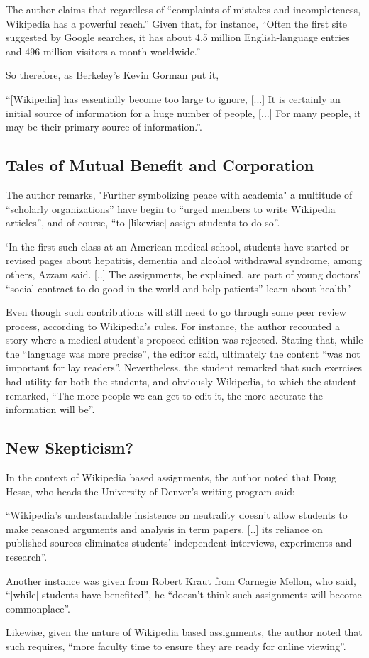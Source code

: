 The author claims that regardless of ``complaints of mistakes and incompleteness, Wikipedia has a powerful reach.'' Given that, for instance, ``Often the first site suggested by Google searches, it has about 4.5 million English-language entries and 496 million visitors a month worldwide.''

So therefore, as Berkeley’s Kevin Gorman put it,

``[Wikipedia] has essentially become too large to ignore, [...] It is certainly an initial source of information for a huge number of people, [...] For many people, it may be their primary source of information.''. 


\subsection{Tales of Mutual Benefit and Corporation}

The author remarks, "Further symbolizing peace with academia" a multitude of ``scholarly organizations'' have begin to ``urged members to write Wikipedia articles'', and of course, ``to [likewise] assign students to do so''.

`In the first such class at an American medical school, students have started or revised pages about hepatitis, dementia and alcohol withdrawal syndrome, among others, Azzam said. [..] The assignments, he explained, are part of young doctors’ “social contract to do good in the world and help patients” learn about health.'

Even though such contributions will still need to go through some peer review process, according to Wikipedia's rules. For instance, the author recounted a story where a medical student's proposed edition was rejected. Stating that, while the ``language was more precise'', the editor said, ultimately the content ``was not important for lay readers''. Nevertheless, the student remarked that such exercises had utility for both the students, and obviously Wikipedia, to which the student remarked, ``The more people we can get to edit it, the more accurate the information will be''.


\subsection{New Skepticism?}

In the context of Wikipedia based assignments, the author noted that Doug Hesse, who heads the University of Denver’s writing program said:

``Wikipedia’s understandable insistence on neutrality doesn’t allow students to make reasoned arguments and analysis in term papers. [..] its reliance on published sources eliminates students’ independent interviews, experiments and research''.

Another instance was given from Robert Kraut from Carnegie Mellon, who said, ``[while] students have benefited'', he ``doesn’t think such assignments will become commonplace''.

Likewise, given the nature of Wikipedia based assignments, the author noted that such requires, ``more faculty time to ensure they are ready for online viewing''.



